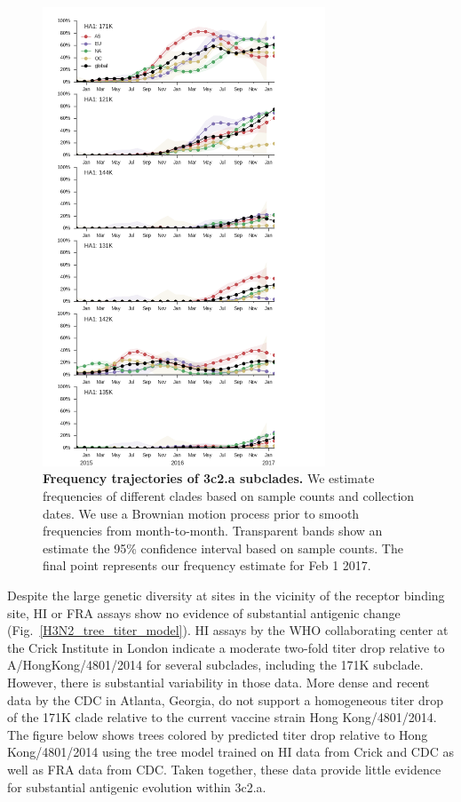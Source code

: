 \documentclass[11pt,oneside,letterpaper]{article}
\begin{document}
\pagebreak

\begin{figure}[H]
	\centering
	\includegraphics[width=0.75\textwidth]{../figures/feb-2017/h3n2_frequencies.png}
	\caption{\textbf{Frequency trajectories of 3c2.a subclades.}
	We estimate frequencies of different clades based on sample counts and collection dates.
	We use a Brownian motion process prior to smooth frequencies from month-to-month.
	Transparent bands show an estimate the 95\% confidence interval based on sample counts.
	The final point represents our frequency estimate for Feb 1 2017.
	}
	\label{H3N2_mutations}
\end{figure}

\pagebreak

Despite the large genetic diversity at sites in the vicinity of the receptor binding site, HI or FRA assays show no evidence of substantial antigenic change (Fig.\ \ref{H3N2_tree_titer_model}).
HI assays by the WHO collaborating center at the Crick Institute in London indicate a moderate two-fold titer drop relative to A/HongKong/4801/2014 for several subclades, including the 171K subclade.
However, there is substantial variability in those data.
More dense and recent data by the CDC in Atlanta, Georgia, do not support a homogeneous titer drop of the 171K clade relative to the current vaccine strain Hong Kong/4801/2014.
The figure below shows trees colored by predicted titer drop relative to Hong Kong/4801/2014 using the tree model \cite{neher2015prediction} trained on HI data from Crick and CDC as well as FRA data from CDC.
Taken together, these data provide little evidence for substantial antigenic evolution within 3c2.a.
\end{document}

